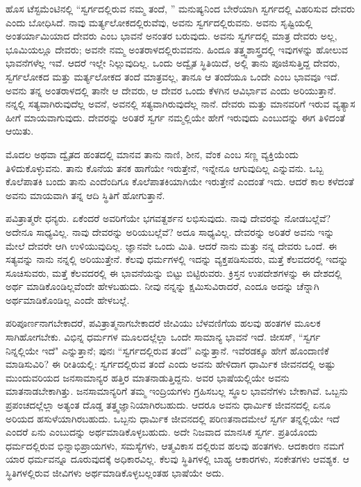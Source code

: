 ಹೊಸ ಟೆಸ್ಟಮೆಂಟಿನಲ್ಲಿ “ಸ್ವರ್ಗದಲ್ಲಿರುವ ನಮ್ಮ ತಂದೆ, '' ಮನುಷ್ಯನಿಂದ ಬೇರೆಯಾಗಿ ಸ್ವರ್ಗದಲ್ಲಿ ವಿಹರಿಸುವ ದೇವರು ಎಂದು ಬೋಧಿಸಿದೆ. ನಾವು ಮರ್ತ್ಯಲೋಕದಲ್ಲಿರುವೆವು, ಅವನು ಸ್ವರ್ಗದಲ್ಲಿರುವನು. ಅವನು ಸೃಷ್ಟಿಯಲ್ಲಿ ಅಂತರ್ಯಾಮಿಯಾದ ದೇವರು ಎಂಬ ಭಾವನೆ ಅನಂತರ ಬರುವುದು. ಅವನು ಸ್ವರ್ಗದಲ್ಲಿ ಮಾತ್ರ ದೇವರು ಅಲ್ಲ, ಭೂಮಿಯಲ್ಲೂ ದೇವರು; ಅವನೇ ನಮ್ಮ ಅಂತರಾಳದಲ್ಲಿರುವವನು. ಹಿಂದೂ ತತ್ತ್ವಶಾಸ್ತ್ರದಲ್ಲಿ ಇವುಗಳನ್ನು ಹೋಲುವ ಭಾವನೆಗಳೆಲ್ಲ ಇವೆ. ಆದರೆ ಇಲ್ಲೇ ನಿಲ್ಲುವುದಿಲ್ಲ. ಒಂದು ಅದ್ವೈತ ಸ್ಥಿತಿಯಿದೆ, ಅಲ್ಲಿ ತಾನು ಪೂಜಿಸುತ್ತಿದ್ದ ದೇವರು, ಸ್ವರ್ಗಲೋಕದ ಮತ್ತು ಮರ್ತ್ಯಲೋಕದ ತಂದೆ ಮಾತ್ರವಲ್ಲ, ತಾನೂ ಆ ತಂದೆಯೂ ಒಂದೇ ಎಂಬ ಭಾವವೂ ಇದೆ. ಅವನು ತನ್ನ ಅಂತರಾಳದಲ್ಲಿ ತಾನೇ ಆ ದೇವರು, ಆ ದೇವರ ಒಂದು ಕೆಳಗಿನ ಆವಿರ್ಭಾವ ಎಂದು ಅರಿಯುತ್ತಾನೆ. ನನ್ನಲ್ಲಿ ಸತ್ಯವಾಗಿರುವುದೆಲ್ಲ ಅವನೆ, ಅವನಲ್ಲಿ ಸತ್ಯವಾಗಿರುವುದೆಲ್ಲ ನಾನೆ. ದೇವರು ಮತ್ತು ಮಾನವರಿಗೆ ಇರುವ ವ್ಯತ್ಯಾಸ ಹೀಗೆ ಮಾಯವಾಗುವುದು. ದೇವರನ್ನು ಅರಿತರೆ ಸ್ವರ್ಗ ನಮ್ಮಲ್ಲಿಯೇ ಹೇಗೆ ಇರುವುದು ಎಂಬುದನ್ನು ಈಗ ತಿಳಿದಂತೆ ಆಯಿತು.

ಮೊದಲ ಅಥವಾ ದ್ವೈತದ ಹಂತದಲ್ಲಿ ಮಾನವ ತಾನು ನಾಣಿ, ಶೀನ, ವೆಂಕ ಎಂಬ ಸಣ್ಣ ವ್ಯಕ್ತಿಯೆಂದು ತಿಳಿದುಕೊಳ್ಳುವನು. ತಾನು ಕೊನೆಯ ತನಕ ಹಾಗೆಯೇ ಇರುತ್ತೇನೆ, ಇನ್ನೇನೂ ಆಗುವುದಿಲ್ಲ ಎನ್ನುವನು. ಒಬ್ಬ ಕೊಲೆಪಾತಕಿ ಬಂದು ತಾನು ಎಂದೆಂದಿಗೂ ಕೊಲೆಪಾತಕಿಯಾಗಿಯೇ ಇರುತ್ತೇನೆ ಎಂದಂತೆ ಇದು. ಆದರೆ ಕಾಲ ಕಳೆದಂತೆ ಅವನು ಮಾಯವಾಗಿ ತನ್ನ ಆದಿ ಸ್ಥಿತಿಗೆ ಹೋಗುತ್ತಾನೆ.

ಪವಿತ್ರಾತ್ಮರೇ ಧನ್ಯರು. ಏಕೆಂದರೆ ಅವರಿಗೆಯೇ ಭಗವತ್ದರ್ಶನ ಲಭಿಸುವುದು. ನಾವು ದೇವರನ್ನು ನೋಡಬಲ್ಲೆವೆ? ಅದೇನೂ ಸಾಧ್ಯವಿಲ್ಲ. ನಾವು ದೇವರನ್ನು ಅರಿಯಬಲ್ಲೆವೆ? ಅದೂ ಸಾಧ್ಯವಿಲ್ಲ. ದೇವರನ್ನು ಅರಿತರೆ ಅವನು ಇನ್ನು ಮೇಲೆ ದೇವರೇ ಆಗಿ ಉಳಿಯುವುದಿಲ್ಲ. ಜ್ಞಾನವೇ ಒಂದು ಮಿತಿ. ಆದರೆ ನಾನು ಮತ್ತು ನನ್ನ ದೇವರು ಒಂದೆ. ಈ ಸತ್ಯವನ್ನು ನಾನು ನನ್ನಲ್ಲಿ ಅರಿಯುತ್ತೇನೆ. ಕೆಲವು ಧರ್ಮಗಳಲ್ಲಿ ಇದನ್ನು ವ್ಯಕ್ತಪಡಿಸುವರು, ಮತ್ತೆ ಕೆಲವದರಲ್ಲಿ ಇದನ್ನು ಸೂಚಿಸುವರು, ಮತ್ತೆ ಕೆಲವದರಲ್ಲಿ ಈ ಭಾವನೆಯನ್ನು ಬಿಟ್ಟು ಬಿಟ್ಟಿರುವರು. ಕ್ರಿಸ್ತನ ಉಪದೇಶಗಳನ್ನು ಈ ದೇಶದಲ್ಲಿ ಅರ್ಥ ಮಾಡಿಕೊಂಡಿಲ್ಲವೆಂದೇ ಹೇಳಬಹುದು. ನೀವು ನನ್ನನ್ನು ಕ್ಷಮಿಸುವಿರಾದರೆ, ಎಂದೂ ಅದನ್ನು ಚೆನ್ನಾಗಿ ಅರ್ಥಮಾಡಿಕೊಂಡಿಲ್ಲ ಎಂದೇ ಹೇಳಬಲ್ಲೆ.

ಪರಿಪೂರ್ಣನಾಗಬೇಕಾದರೆ, ಪವಿತ್ರಾತ್ಮನಾಗಬೇಕಾದರೆ ಜೀವಿಯು ಬೆಳವಣಿಗೆಯ ಹಲವು ಹಂತಗಳ ಮೂಲಕ ಸಾಗಿಹೋಗಬೇಕು. ವಿಭಿನ್ನ ಧರ್ಮಗಳ ಮೂಲದಲ್ಲೆಲ್ಲಾ ಒಂದೇ ಸಾಮಾನ್ಯ ಭಾವನೆ ಇದೆ. ಜೀಸಸ್, “ಸ್ವರ್ಗ ನಿನ್ನಲ್ಲಿಯೇ ಇದೆ" ಎನ್ನುತ್ತಾನೆ; ಪುನಃ “ಸ್ವರ್ಗದಲ್ಲಿರುವ ತಂದೆ'' ಎನ್ನುತ್ತಾನೆ. ಇವೆರಡಕ್ಕೂ ಹೇಗೆ ಹೊಂದಾಣಿಕೆ ಮಾಡಿಸುವಿರಿ? ಈ ರೀತಿಯಲ್ಲಿ: ಸ್ವರ್ಗದಲ್ಲಿರುವ ತಂದೆ ಎಂದು ಅವನು ಹೇಳಿದಾಗ ಧಾರ್ಮಿಕ ಜೀವನದಲ್ಲಿ ಅಷ್ಟು ಮುಂದುವರಿಯದ ಜನಸಾಮಾನ್ಯರ ಹತ್ತಿರ ಮಾತನಾಡುತ್ತಿದ್ದನು. ಅವರ ಭಾಷೆಯಲ್ಲಿಯೇ ಅವನು ಮಾತನಾಡಬೇಕಾಗಿತ್ತು. ಜನಸಾಮಾನ್ಯರಿಗೆ ತಮ್ಮ ಇಂದ್ರಿಯಗಳು ಗ್ರಹಿಸಬಲ್ಲ ಸ್ಥೂಲ ಭಾವನೆಗಳು ಬೇಕಾಗಿವೆ. ಒಬ್ಬನು ಪ್ರಪಂಚದಲ್ಲೆಲ್ಲಾ ಅತ್ಯಂತ ದೊಡ್ಡ ತತ್ತ್ವಜ್ಞಾನಿಯಾಗಿರಬಹುದು. ಆದರೂ ಅವನು ಧಾರ್ಮಿಕ ಜೀವನದಲ್ಲಿ ಏನೂ ಅರಿಯದ ಹಸುಳೆಯಾಗಿರಬಹುದು. ಒಬ್ಬನು ಧಾರ್ಮಿಕ ಜೀವನದಲ್ಲಿ ಪರಿಣತನಾದಮೇಲೆ ಸ್ವರ್ಗ ತನ್ನಲ್ಲಿಯೇ ಇದೆ ಎಂದರೆ ಏನು ಎಂಬುದನ್ನು ಅರ್ಥಮಾಡಿಕೊಳ್ಳಬಹುದು. ಅದೇ ನಿಜವಾದ ಮಾನಸಿಕ ಸ್ವರ್ಗ. ಪ್ರತಿಯೊಂದು ಧರ್ಮದಲ್ಲಿರುವ ಭಿನ್ನಾಭಿಪ್ರಾಯಗಳು, ಸಮಸ್ಯೆಗಳು, ಆತ್ಮವಿಕಾಸ ದಲ್ಲಿರುವ ಹಲವು ಹಂತಗಳು. ಆದಕಾರಣ ನಮಗೆ ಯಾರ ಧರ್ಮವನ್ನೂ ದೂರುವುದಕ್ಕೆ ಅಧಿಕಾರವಿಲ್ಲ. ಕೆಲವು ಸ್ಥಿತಿಗಳಲ್ಲಿ ಬಾಹ್ಯ ಆಕಾರಗಳು, ಸಂಕೇತಗಳು ಆವಶ್ಯಕ. ಆ ಸ್ಥಿತಿಗಳಲ್ಲಿರುವ ಜೀವಿಗಳು ಅರ್ಥಮಾಡಿಕೊಳ್ಳಬಲ್ಲಂತಹ ಭಾಷೆಯೇ ಅದು.

